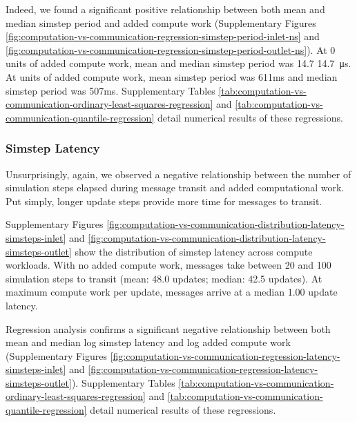 Indeed, we found a significant positive relationship between both mean and median simstep period and added compute work (Supplementary Figures \ref{fig:computation-vs-communication-regression-simstep-period-inlet-ns} and \ref{fig:computation-vs-communication-regression-simstep-period-outlet-ns}).
At 0 units of added compute work, mean and median simstep period was 14.7 \SI{14.7}{\micro\second}.
At  units of added compute work, mean simstep period was 611ms and median simstep period was 507ms.
Supplementary Tables \ref{tab:computation-vs-communication-ordinary-least-squares-regression} and \ref{tab:computation-vs-communication-quantile-regression} detail numerical results of these regressions.

\subsubsection{Simstep Latency}

Unsurprisingly, again, we observed a negative relationship between the number of simulation steps elapsed during message transit and added computational work.
Put simply, longer update steps provide more time for messages to transit.

Supplementary Figures \ref{fig:computation-vs-communication-distribution-latency-simsteps-inlet} and \ref{fig:computation-vs-communication-distribution-latency-simsteps-outlet} show the distribution of simstep latency across compute workloads.
With no added compute work, messages take between 20 and 100 simulation steps to transit (mean: 48.0 updates; median: 42.5 updates).
At maximum compute work per update, messages arrive at a median 1.00 update latency.

Regression analysis confirms a significant negative relationship between both mean and median log simstep latency and log added compute work (Supplementary Figures \ref{fig:computation-vs-communication-regression-latency-simsteps-inlet} and \ref{fig:computation-vs-communication-regression-latency-simsteps-outlet}).
Supplementary Tables \ref{tab:computation-vs-communication-ordinary-least-squares-regression} and \ref{tab:computation-vs-communication-quantile-regression} detail numerical results of these regressions.

